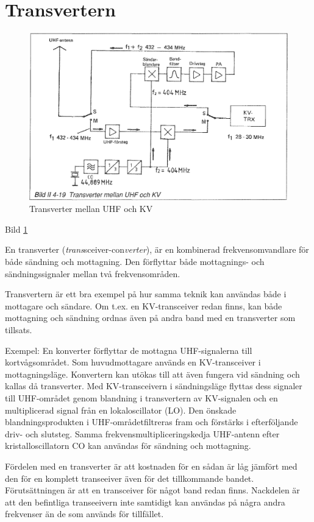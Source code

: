 \section{Transvertern}

\begin{figure}
  \includegraphics[width=\textwidth]{images/bild_2_4-19}
  \caption{Transverter mellan UHF och KV}
  \label{fig:bildII4-19}
\end{figure}

Bild \ref{fig:bildII4-19}

En transverter (\emph{trans}sceiver-con\emph{verter}), är en
kombinerad frekvensomvandlare för både sändning och mottagning. Den
förflyttar både mottagnings- och sändningssignaler mellan två
frekvensområden.

Transvertern är ett bra exempel på hur samma teknik kan användas både
i mottagare och sändare. Om t.ex. en KV-transceiver redan finns, kan
både mottagning och sändning ordnas även på andra band med en
transverter som tillsats.

Exempel: En konverter förflyttar de mottagna UHF-signalerna till
kortvågsområdet. Som huvudmottagare används en KV-transceiver i
mottagningsläge. Konvertern kan utökas till att även fungera vid
sändning och kallas då transverter. Med KV-transceivern i
sändningsläge flyttas dess signaler till UHF-området genom blandning
i transvertern av KV-signalen och en multiplicerad signal från en
lokaloscillator (LO). Den önskade blandningsprodukten i
UHF-områdetfiltreras fram och förstärks i efterföljande driv- och
slutsteg. Samma frekvensmultipliceringskedja UHF-antenn efter
kristalloscillatorn CO kan användas för sändning och mottagning.

Fördelen med en transverter är att kostnaden för en sådan är låg
jämfört med den för en komplett transeeiver även för det tillkommande
bandet. Förutsättningen är att en transceiver för något band redan
finns.  Nackdelen är att den befintliga transeeivern inte samtidigt
kan användas på några andra frekvenser än de som används för
tillfället.
